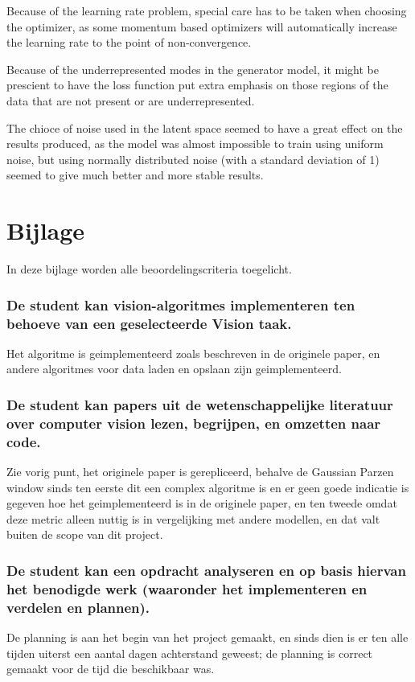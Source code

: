 Because of the learning rate problem, special care has to be taken when choosing the optimizer,
as some momentum based optimizers will automatically increase the learning rate to the point of
non-convergence.

Because of the underrepresented modes in the generator model, it might be prescient to have the
loss function put extra emphasis on those regions of the data that are not present or are
underrepresented.

The chioce of noise used in the latent space seemed to have a great effect on the results
produced, as the model was almost impossible to train using uniform noise, but using normally
distributed noise (with a standard deviation of 1) seemed to give much better and more stable
results.

\section{Bijlage}\label{sec:bijlage}
In deze bijlage worden alle beoordelingscriteria toegelicht.

\subsubsection{De student kan vision-algoritmes implementeren ten behoeve van een geselecteerde
    Vision taak.}
Het algoritme is geimplementeerd zoals beschreven in de originele paper, en andere algoritmes
voor data laden en opslaan zijn geimplementeerd.
\subsubsection{De student kan papers uit de wetenschappelijke literatuur over computer vision lezen,
    begrijpen, en omzetten naar code.}
Zie vorig punt, het originele paper is gerepliceerd, behalve de Gaussian Parzen window sinds ten
eerste dit een complex algoritme is en er geen goede indicatie is gegeven hoe het geimplementeerd
is in de originele paper, en ten tweede omdat deze metric alleen nuttig is in vergelijking met
andere modellen, en dat valt buiten de scope van dit project.
\subsubsection{De student kan een opdracht analyseren en op basis hiervan het benodigde werk
    (waaronder het implementeren en verdelen en plannen).}
De planning is aan het begin van het project gemaakt, en sinds dien is er ten alle tijden uiterst
een aantal dagen achterstand geweest; de planning is correct gemaakt voor de tijd die beschikbaar was.
